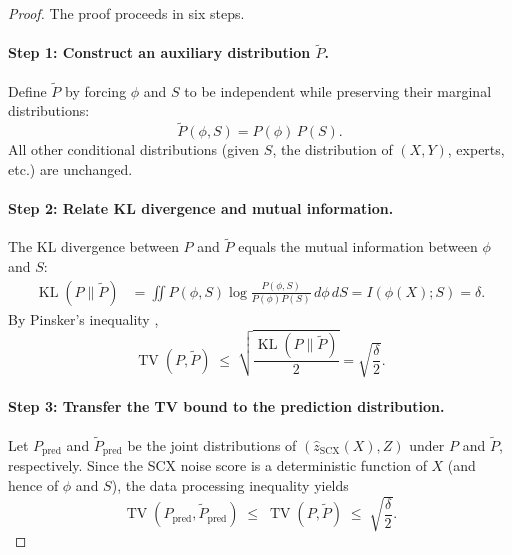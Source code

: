 \begin{proof}
The proof proceeds in six steps.

\paragraph{Step 1: Construct an auxiliary distribution $\tilde{P}$.}
Define $\tilde{P}$ by forcing $\phi$ and $S$ to be independent while preserving
their marginal distributions:
\begin{equation}
\tilde{P}(\phi, S) = P(\phi)\, P(S).
\label{eq:aux-dist}
\end{equation}
All other conditional distributions (given $S$, the distribution of $(X,Y)$,
experts, etc.) are unchanged.

\paragraph{Step 2: Relate KL divergence and mutual information.}
The KL divergence between $P$ and $\tilde{P}$ equals the mutual information
between $\phi$ and $S$:
\begin{align*}
\operatorname{KL}(P \parallel \tilde{P})
&= \iint P(\phi, S) \log\frac{P(\phi, S)}{P(\phi)P(S)}\, d\phi\, dS
= I(\phi(X); S) = \delta.
\end{align*}
By Pinsker's inequality \cite{pinsker1964},
\begin{equation}
\operatorname{TV}(P, \tilde{P}) \;\leq\;
\sqrt{\frac{\operatorname{KL}(P \parallel \tilde{P})}{2}}
= \sqrt{\frac{\delta}{2}}.
\label{eq:pinsker-tv-bound}
\end{equation}

\paragraph{Step 3: Transfer the TV bound to the prediction distribution.}
Let $P_{\text{pred}}$ and $\tilde{P}_{\text{pred}}$ be the joint distributions
of $(\hat{z}_{\text{SCX}}(X), Z)$ under $P$ and $\tilde{P}$, respectively.
Since the SCX noise score is a deterministic function of $X$ (and hence of
$\phi$ and $S$), the data processing inequality \cite{cover2006} yields
\begin{equation}
\operatorname{TV}(P_{\text{pred}}, \tilde{P}_{\text{pred}})
\;\leq\; \operatorname{TV}(P, \tilde{P})
\;\leq\; \sqrt{\frac{\delta}{2}}.
\label{eq:dp-tv}
\end{equation}


\end{proof}
